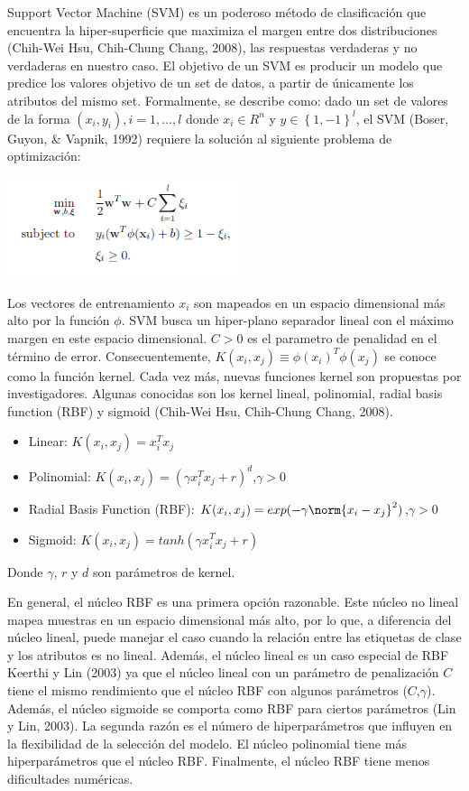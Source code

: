 Support Vector Machine (SVM) es un poderoso método de clasificación que encuentra la hiper-superficie que maximiza el margen entre dos distribuciones (Chih-Wei Hsu, Chih-Chung Chang, 2008), las respuestas verdaderas y no verdaderas en nuestro caso. El objetivo de un SVM es producir un modelo que predice los valores objetivo de un set de datos, a partir de únicamente los atributos del mismo set.  Formalmente, se describe como: dado un set de valores de la forma $(x_i,y_i), i=1, ..., l$  donde  $x_i \in R^n$ y $y\in\left\lbrace1,-1\right\rbrace^l$, el SVM (Boser, Guyon, \& Vapnik, 1992) requiere la solución al siguiente problema de optimización: 
\begin{center}
\includegraphics[height=1.15in]{figuras/Imagen1.png}
\end{center}
Los vectores de entrenamiento $x_i$ son mapeados en un espacio dimensional más alto por la función $\phi$. SVM busca un hiper-plano separador lineal con el máximo margen en este espacio dimensional. $C > 0$ es el parametro de penalidad en el término de error. Consecuentemente, $K(x_i,x_j)\equiv \phi(x_i )^T \phi(x_j)$ se conoce como la función kernel. Cada vez más, nuevas funciones kernel son propuestas por investigadores. Algunas conocidas son los kernel lineal, polinomial, radial basis function (RBF) y sigmoid (Chih-Wei Hsu, Chih-Chung Chang, 2008). 

\begin{itemize}
\item Linear: $K(x_i,x_j ) = x_i^Tx_j$
\item Polinomial: $K(x_i,x_j ) = (\gamma x_i^Tx_j + r)^d$,$\gamma > 0$
\item Radial Basis Function (RBF): $K(x_i,x_j ) = exp(-\gamma \norm{x_i-x_j}^2)$,$\gamma>0$
\item Sigmoid: $K(x_i,x_j ) = tanh(\gamma x_i^Tx_j + r)$
\end{itemize}

Donde $\gamma$, $r$ y $d$ son parámetros de kernel.  

En general, el núcleo RBF es una primera opción razonable.  Este núcleo no lineal mapea muestras en un espacio dimensional más alto, por lo que, a diferencia del núcleo lineal, puede manejar el caso cuando la relación entre las etiquetas de clase y los atributos es no lineal.  Además, el núcleo lineal es un caso especial de RBF Keerthi y Lin (2003) ya que el núcleo lineal con un parámetro de penalización $C$ tiene el mismo rendimiento que el núcleo RBF con algunos parámetros ($C$,$\gamma$).  Además, el núcleo sigmoide se comporta como RBF para ciertos parámetros (Lin y Lin, 2003). La segunda razón es el número de hiperparámetros que influyen en la flexibilidad de la selección del modelo.  El núcleo polinomial tiene más hiperparámetros que el núcleo RBF. Finalmente, el núcleo RBF tiene menos dificultades numéricas. 

